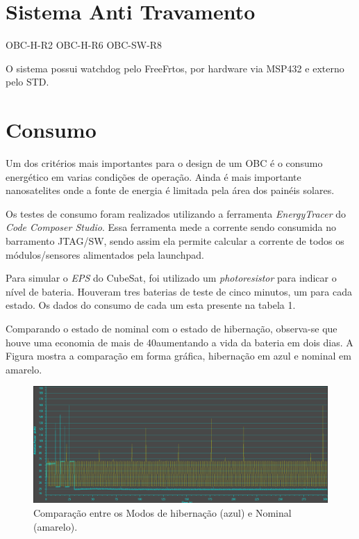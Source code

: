 \section{Sistema Anti Travamento}
OBC-H-R2
OBC-H-R6
OBC-SW-R8

O sistema possui watchdog pelo FreeFrtos, por hardware via MSP432 e externo pelo STD.

\section{Consumo}

Um dos critérios mais importantes para o design de um OBC é o consumo energético em varias condições de operação. Ainda é mais importante nanosatelites onde a fonte de energia é limitada pela área dos painéis solares. 

Os testes de consumo foram realizados utilizando a ferramenta \textit{EnergyTracer} do \textit{Code Composer Studio}. Essa ferramenta mede a corrente sendo consumida no barramento JTAG/SW, sendo assim ela permite calcular a corrente de todos os módulos/sensores alimentados pela launchpad. 

Para simular o \textit{EPS} do CubeSat, foi utilizado um \textit{photoresistor} para indicar o nível de bateria. Houveram tres baterias de teste de cinco minutos, um para cada estado. Os dados do consumo de cada um esta presente na tabela 1.

Comparando o estado de nominal com o estado de hibernação, observa-se que houve uma economia de mais de 40\textperthousand aumentando a vida da bateria em dois dias. A Figura mostra a comparação em forma gráfica, hibernação em azul e nominal em amarelo.

\begin{figure}[h]
	\centering
	\caption{Comparação entre os Modos de hibernação (azul) e Nominal (amarelo).}
	\includegraphics[keepaspectratio=true,scale=0.470]{figuras/hibernatexNormal.PNG}
	
	\label{hibernatexNormal}
\end{figure}

